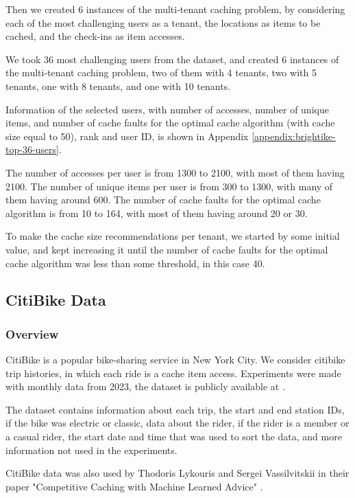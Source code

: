 Then we created 6 instances of the multi-tenant caching problem, by considering each of the most 
challenging users as a tenant, the locations as items to be cached, and the check-ins as item accesses.

We took 36 most challenging users from the dataset, and created 6 instances of the multi-tenant caching
problem, two of them with 4 tenants, two with 5 tenants, one with 8 tenants, and one with 10 tenants.

Information of the selected users, with number of accesses, number of unique items, and number of cache
faults for the optimal cache algorithm (with cache size equal to 50), rank and user ID, is shown in
Appendix \ref{appendix:brightike-top-36-users}.

The number of accesses per user is from 1300 to 2100, with most of them having 2100. The number of
unique items per user is from 300 to 1300, with many of them having around 600. The number of cache
faults for the optimal cache algorithm is from 10 to 164, with most of them having around 20 or 30.

To make the cache size recommendations per tenant, we started by some initial value, and kept increasing 
it until the number of cache faults for the optimal cache algorithm was less than some threshold, in this
case 40.

\subsection{CitiBike Data}

\subsubsection{Overview}

CitiBike is a popular bike-sharing service in New York City. We consider citibike trip histories, 
in which each ride is a cache item access. Experiments were made with monthly data from 2023, 
the dataset is publicly available at \cite{citibike-data}.

The dataset contains information about each trip, the start and end station IDs, if the bike
was electric or classic, data about the rider, if the rider is a member or a casual rider, 
the start date and time that was used to sort the data, and more information not used in the 
experiments.

CitiBike data was also used by Thodoris Lykouris and Sergei Vassilvitskii in their paper "Competitive 
Caching with Machine Learned Advice" \cite{datasets-reference}.


